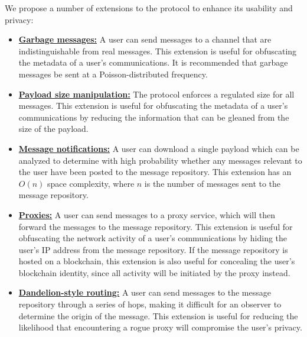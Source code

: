 We propose a number of extensions to the protocol to enhance its usability and privacy:

\begin{itemize}
\item
    \hyperref[garbage-messages]{\textbf{Garbage messages:}} A user can send messages to a channel that are indistinguishable from real messages. This extension is useful for obfuscating the metadata of a user's communications. It is recommended that garbage messages be sent at a Poisson-distributed frequency.
\item
    \hyperref[payload-size]{\textbf{Payload size manipulation:}} The protocol enforces a regulated size for all messages. This extension is useful for obfuscating the metadata of a user's communications by reducing the information that can be gleaned from the size of the payload.
\item
    \hyperref[message-notifications]{\textbf{Message notifications:}} A user can download a single payload which can be analyzed to determine with high probability whether any messages relevant to the user have been posted to the message repository. This extension has an $O(n)$ space complexity, where $n$ is the number of messages sent to the message repository.
\item
    \hyperref[proxies]{\textbf{Proxies:}} A user can send messages to a proxy service, which will then forward the messages to the message repository. This extension is useful for obfuscating the network activity of a user's communications by hiding the user's IP address from the message repository. If the message repository is hosted on a blockchain, this extension is also useful for concealing the user's blockchain identity, since all activity will be initiated by the proxy instead.
\item
    \hyperref[dandelion-style-routing]{\textbf{Dandelion-style routing:}} A user can send messages to the message repository through a series of hops, making it difficult for an observer to determine the origin of the message. This extension is useful for reducing the likelihood that encountering a rogue proxy will compromise the user's privacy.
\end{itemize}

